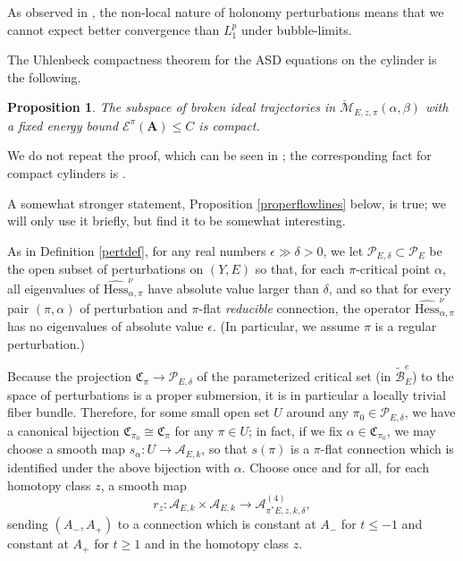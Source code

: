 \documentclass{memo-l}
\newcommand{\pE}{\pi^* \! E}
\newtheorem{proposition}[theorem]{Proposition}
\theoremstyle{definition}
\theoremstyle{remark}
\numberwithin{section}{chapter}
\numberwithin{equation}{chapter}
\begin{document}
As observed in \cite{Kronheimer}, the non-local nature of holonomy perturbations means that we cannot expect better convergence than $L^p_1$ under bubble-limits.

The Uhlenbeck compactness theorem for the ASD equations on the cylinder is the following.

\begin{proposition}The subspace of broken ideal trajectories in $\check{\mathcal M}_{E,z,\pi}(\alpha, \beta)$ with a fixed energy bound $\mathcal E^\pi(\mathbf{A}) \leq C$ is compact.
\end{proposition}

We do not repeat the proof, which can be seen in \cite[Section~5.1]{Don}; the corresponding fact for compact cylinders is \cite[Proposition~3.20]{KM1}.

A somewhat stronger statement, Proposition \ref{properflowlines} below, is true; we will only use it briefly, but find it to be somewhat interesting. 

As in Definition \ref{pertdef}, for any real numbers $\epsilon \gg \delta > 0$, we let $\mathcal P_{E,\delta} \subset \mathcal P_E$ be the open subset of perturbations on $(Y,E)$ so that, for each $\pi$-critical point $\alpha$, all eigenvalues of $\widehat{\text{Hess}}^\nu_{\alpha,\pi}$ have absolute value larger than $\delta$, and so that for every pair $(\pi, \alpha)$ of perturbation and $\pi$-flat \emph{reducible} connection, the operator $\widehat{\text{Hess}}^\nu_{\alpha,\pi}$ has no eigenvalues of absolute value $\epsilon$. (In particular, we assume $\pi$ is a regular perturbation.) 

Because the projection $\mathfrak C_\pi \to \mathcal P_{E,\delta}$ of the parameterized critical set (in $\widetilde{\mathcal B}^e_E$) to the space of perturbations is a proper submersion, it is in particular a locally trivial fiber bundle. Therefore, for some small open set $U$ around any $\pi_0 \in \mathcal P_{E,\delta}$, we have a canonical bijection $\mathfrak C_{\pi_0} \cong \mathfrak C_{\pi}$ for any $\pi \in U$; in fact, if we fix $\alpha \in \mathfrak C_{\pi_0}$, we may choose a smooth map $s_\alpha: U \to \mathcal A_{E,k}$, so that $s(\pi)$ is a $\pi$-flat connection which is identified under the above bijection with $\alpha$. Choose once and for all, for each homotopy class $z$, a smooth map 
$$r_z: \mathcal A_{E,k} \times \mathcal A_{E,k} \to \mathcal A^{(4)}_{\pE,z,k,\delta},$$ 
sending $(A_-, A_+)$ to a connection which is constant at $A_-$ for $t \leq -1$ and constant at $A_+$ for $t \geq 1$ and in the homotopy class $z$. 
\end{document}
